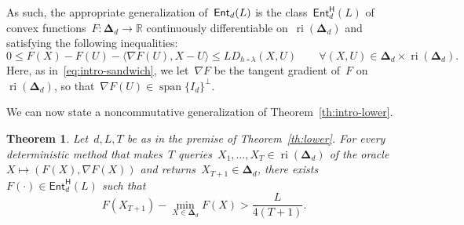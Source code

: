 \documentclass[11pt]{article}
\numberwithin{equation}{section}
\let\le\leqslant
\newtheorem{theorem}{Theorem}%
\theoremstyle{remark}
\newcommand{\R}{\mathbb{R}}
\newcommand{\inner}[2]{\langle #1,#2\rangle}
\newcommand{\ri}{\operatorname{ri}}
\newcommand{\Ent}{\textup{\textsf{Ent}}}
\newcommand{\Orc}{\mathscr{O}}
\newcommand{\Fh}{\Ent_d}
\newcommand{\Dens}{\boldsymbol{\Delta}_d}
\newcommand{\Qd}{\mathsf{Ent}_d^\mathsf{H}}
\newcommand{\qre}[2]{D_{h \hspace{1pt} \circ \lambda}(#1,#2)}
\newcommand{\spanof}[1]{\operatorname{span}\{#1\}}
\newcommand{\1}{\mathbf{1}}
\newcommand{\bnabla}{\nabla}
\begin{document}
As such, the appropriate generalization of~$\Fh(L)$ is the class~$\Qd(L)$ of convex functions~$F: \Dens \to \R$ continuously differentiable on~$\ri(\Dens)$ and satisfying the following inequalities:
\begin{equation}
\label{eq:quantum-sandwich}
0\le F(X)-F(U)-\inner{\bnabla F(U)}{X-U} 
\le L\qre{X}{U} \qquad \forall (X,U) \in \Dens \times \ri(\Dens).
\end{equation}
Here, as in~\eqref{eq:intro-sandwich}, we let~$\bnabla F$ be the tangent gradient of~$F$ on~$\ri(\Dens)$, so that~$\bnabla F(U) \in \spanof{I_d}^\perp$. 

We can now state a noncommutative generalization of Theorem~\ref{th:intro-lower}.


\begin{theorem}
\label{th:quantum}
Let~$d,L,T$ be as in the premise of Theorem~\ref{th:lower}. 
For every deterministic method that makes~$T$ queries~$X_1, \dots, X_T \in \ri(\Dens)$ of the oracle~$X \mapsto (F(X),\bnabla F(X))$ and returns~$X_{T+1}\in\Dens$, there exists~$F(\cdot)\in\Qd(L)$ such that
\begin{equation}
\label{eq:quantum-bound}
F(X_{T+1})-\min_{X\in\Dens}F(X)>
\frac{L}{4(T+1)}.
\end{equation}
\end{theorem}
\end{document}
